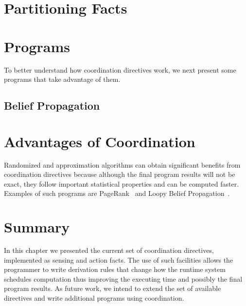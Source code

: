 \section{Partitioning Facts}

\section{Programs}

To better understand how coordination directives work, we next present some programs that
take advantage of them.

\subsection{Belief Propagation}

\section{Advantages of Coordination}

Randomized and approximation algorithms can obtain significant benefits from
coordination directives because although the final program results will not be
exact, they follow important statistical properties and can be computed faster.
Examples of such programs are PageRank~\cite{Lubachevsky:1986:CAA:4904.4801} and
Loopy Belief Propagation~\cite{Gonzalez+al:aistats09paraml}.

\section{Summary}

In this chapter we presented the current set of coordination directives,
implemented as sensing and action facts. The use of such facilities allows the
programmer to write derivation rules that change how the runtime system
schedules computation thus improving the executing time and possibly the final
program results. As future work, we intend to extend the set of available
directives and write additional programs using coordination.
